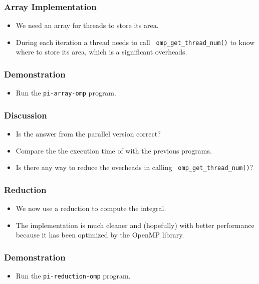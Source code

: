 \documentclass{beamer}
\begin{document}
\begin{frame}
\frametitle{Array Implementation}
\begin{itemize}
\item We need an array for threads to store its area.
\item During each iteration a thread needs to call {\tt
  omp\_get\_thread\_num()} to know where to store its area, which is a
  significant overheads.
\end{itemize}
\end{frame}

\begin{frame}
\end{frame}

\begin{frame}
  \frametitle{Demonstration}
  \begin{itemize}
  \item Run the {\tt pi-array-omp} program.
  \end{itemize}
\end{frame}

\begin{frame}
  \frametitle{Discussion}
  \begin{itemize}
  \item Is the answer from the parallel version correct? 
  \item Compare the the execution time of with the previous programs.
  \item Is there any way to reduce the overheads in calling {\tt
    omp\_get\_thread\_num()}?
  \end{itemize}
\end{frame}

\begin{frame}
  \frametitle{Reduction}
  \begin{itemize}
  \item We now use a reduction to compute the integral.
  \item The implementation is much cleaner and (hopefully) with better
    performance because it has been optimized by the OpenMP library.
  \end{itemize}
\end{frame}

\begin{frame}
\end{frame}

\begin{frame}
  \frametitle{Demonstration}
  \begin{itemize}
  \item Run the {\tt pi-reduction-omp} program.
  \end{itemize}
\end{frame}
\end{document}
